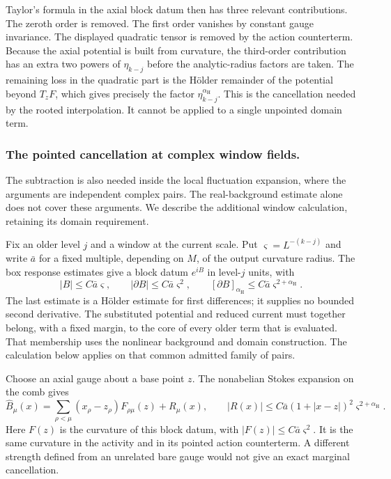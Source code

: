 \documentclass[11pt,letterpaper,reqno]{amsart}
\theoremstyle{definition}
\theoremstyle{remark}
\begin{document}
Taylor's formula in the axial block datum
then has three relevant contributions.
The zeroth order is removed. The first
order vanishes by constant gauge invariance.
The displayed quadratic tensor is removed
by the action counterterm. Because the
axial potential is built from curvature,
the third-order contribution has an extra
two powers of $\eta_{k-j}$ before the
analytic-radius factors are taken. The
remaining loss in the quadratic part is
the H\"older remainder of the potential
beyond $T_zF$, which gives precisely the
factor $\eta_{k-j}^{\alpha_{\mathrm H}}$.
This is the cancellation needed by the
rooted interpolation. It cannot be applied
to a single unpointed domain term.

\subsubsection*{The pointed cancellation at complex window fields.}
The subtraction is also needed inside the local fluctuation
expansion, where the arguments are independent complex pairs.
The real-background estimate alone does not cover these
arguments. We describe the additional window calculation,
retaining its domain requirement.

Fix an older level $j$ and a window at the current scale. Put
$\varsigma=L^{-(k-j)}$ and write $\bar a$ for a fixed
multiple, depending on $M$, of the output curvature radius.
The box response estimates give a block datum $e^{iB}$ in
level-$j$ units, with
\[
 |B|\le C\bar a\varsigma,\qquad
 |\partial B|\le C\bar a\varsigma^2,\qquad
 [\partial B]_{\alpha_{\mathrm H}}
                         \le C\bar a\varsigma^{2+\alpha_{\mathrm H}}.
\]
The last estimate is a H\"older estimate for first differences;
it supplies no bounded second derivative. The substituted
potential and reduced current must together belong, with a
fixed margin, to the core of every older term that is evaluated.
That membership uses the nonlinear background and domain
construction. The calculation below applies on that common
admitted family of pairs.

Choose an axial gauge about a base point $z$. The nonabelian
Stokes expansion on the comb gives
\begin{equation}\label{eq:deep-complex-axial-datum}
 \widehat B_\mu(x)
  =\sum_{\rho<\mu}(x_\rho-z_\rho)F_{\rho\mu}(z)
           +R_\mu(x),\qquad
 |R(x)|\le C\bar a(1+|x-z|)^2
                         \varsigma^{2+\alpha_{\mathrm H}}.
\end{equation}
Here $F(z)$ is the curvature of this block datum, with
$|F(z)|\le C\bar a\varsigma^2$. It is the same curvature
in the activity and in its pointed action counterterm. A
different strength defined from an unrelated bare gauge would
not give an exact marginal cancellation.
\end{document}
